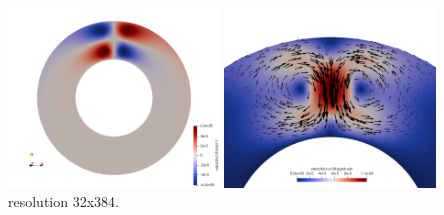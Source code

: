 \begin{center}
\includegraphics[width=5.6cm]{python_codes/fieldstone_151/results/test5/vt}
\includegraphics[width=5.6cm]{python_codes/fieldstone_151/results/test5/vel2}\\
{\captionfont resolution 32x384.}
\end{center}



